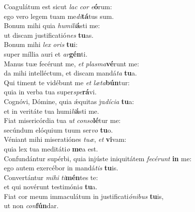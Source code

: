 \evenverse Coagulátum est sicut \textit{lac} \textit{cor} \textit{e}\textbf{ó}rum:~\*\\
\evenverse ego vero legem tuam me\textit{di}\textbf{tá}tus sum.\\
\oddverse Bonum mihi quia \textit{hu}\textit{mi}\textit{li}\textbf{á}sti me:~\*\\
\oddverse ut discam justificatió\textit{nes} \textbf{tu}as.\\
\evenverse Bonum mihi \textit{lex} \textit{o}\textit{ris} \textbf{tu}i:~\*\\
\evenverse super míllia auri et \textit{ar}\textbf{gén}ti.\\
\oddverse Manus tuæ fecérunt me, \textit{et} \textit{plas}\textit{ma}\textbf{vé}runt me:~\*\\
\oddverse da mihi intelléctum, et discam mandá\textit{ta} \textbf{tu}a.\\
\evenverse Qui timent te vidébunt me \textit{et} \textit{læ}\textit{ta}\textbf{bún}tur:~\*\\
\evenverse quia in verba tua super\textit{spe}\textbf{rá}vi.\\
\oddverse Cognóvi, Dómine, quia ǽquitas ju\textit{dí}\textit{ci}\textit{a} \textbf{tu}a:~\*\\
\oddverse et in veritáte tua humi\textit{li}\textbf{á}sti me.\\
\evenverse Fiat misericórdia tua \textit{ut} \textit{con}\textit{so}\textbf{lé}tur me:~\*\\
\evenverse secúndum elóquium tuum ser\textit{vo} \textbf{tu}o.\\
\oddverse Véniant mihi miseratiónes \textit{tu}\textit{æ}, \textit{et} \textbf{vi}vam:~\*\\
\oddverse quia lex tua meditáti\textit{o} \textbf{me}a est.\\
\evenverse Confundántur supérbi, quia injúste iniquitátem \textit{fe}\textit{cé}\textit{runt} \textbf{in} me:~\*\\
\evenverse ego autem exercébor in mandá\textit{tis} \textbf{tu}is.\\
\oddverse Convertántur \textit{mi}\textit{hi} \textit{ti}\textbf{mén}tes te:~\*\\
\oddverse et qui novérunt testimóni\textit{a} \textbf{tu}a.\\
\evenverse Fiat cor meum immaculátum in justificati\textit{ó}\textit{ni}\textit{bus} \textbf{tu}is,~\*\\
\evenverse ut non \textit{con}\textbf{fún}dar.\\
